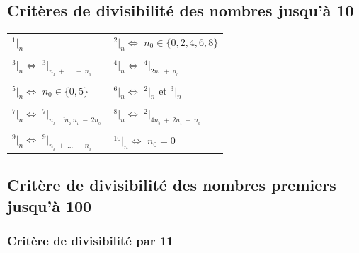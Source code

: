 \documentclass[a4paper]{article}
\begin{document}
\subsection{Critères de divisibilité des nombres jusqu'à 10}
	
	\bigskip
	
	{\huge{\parindent=0mm
	\begin{tabular}{l||l}
		
		$^1|_n$ &
		$^2|_n \Leftrightarrow$ {\Large $n_0 \in \{ 0,2,4,6,8 \}$} \\
		
	\tabularnewline

		$^3|_n \Leftrightarrow$ $^3|_{n_{_k}~+~\ldots~+~n_{_0}}$ &
		$^4|_n \Leftrightarrow$ $^4|_{2 n_{_1}~+~n_{_0}}$ \\
	
	\tabularnewline

		$^5|_n \Leftrightarrow$ {\Large $n_0 \in \{ 0,5 \}$} &
		$^6|_n \Leftrightarrow$ $^2|_n$ {\Large et} $^3|_n$ \\
	
	\tabularnewline	
		
		$^7|_n \Leftrightarrow$ $^7|_{ \overline{n_{_k}~\dots~n_{_2}~n_{_1}} ~-~2 n_{_0}}~$ & 
		$^8|_n \Leftrightarrow$ $^2|_{4n_{_2}~+~2n_{_1}~+~n_{_0}}$ \\
	
	\tabularnewline	
	
		$^9|_n \Leftrightarrow$ $^9|_{n_{_k}~+~\ldots~+~n_{_0}}$ &
		$^{10}|_n \Leftrightarrow$ {\Large $n_0 = 0$} \\

	\end{tabular}
	
	}}
	
\let\thefootnote\relax{}


\bigskip

\pagebreak

\subsection{Critère de divisibilité des nombres premiers jusqu'à 100}

\subsubsection*{Critère de divisibilité par 11}
\end{document}
